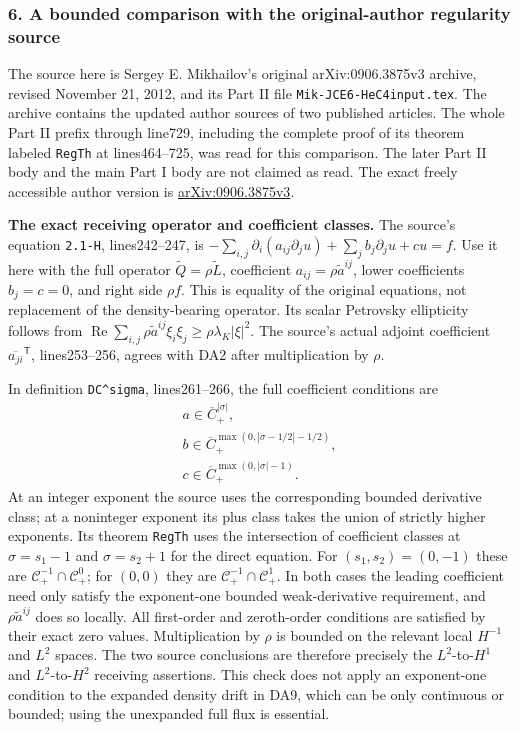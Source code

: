 \documentclass[
  11pt,
]{article}
\begin{document}
\subsubsection{6. A bounded comparison with the original-author
regularity
source}\label{a-bounded-comparison-with-the-original-author-regularity-source}

The source here is Sergey E. Mikhailov's original arXiv:0906.3875v3
archive, revised November 21, 2012, and its Part II file
\texttt{Mik-JCE6-HeC4input.tex}. The archive contains the updated author
sources of two published articles. The whole Part II prefix through
line729, including the complete proof of its theorem labeled
\texttt{RegTh} at lines464--725, was read for this comparison. The later
Part II body and the main Part I body are not claimed as read. The exact
freely accessible author version is
\href{https://arxiv.org/abs/0906.3875v3}{arXiv:0906.3875v3}.

\textbf{The exact receiving operator and coefficient classes.} The
source's equation \texttt{2.1-H}, lines242--247, is
\(-\sum_{i,j}\partial_i(a_{ij}\partial_j u)+\sum_jb_j\partial_ju+cu=f\).
Use it here with the full operator \(\widetilde Q=\rho\widetilde L\),
coefficient \(a_{ij}=\rho\widetilde a^{ij}\), lower coefficients
\(b_j=c=0\), and right side \(\rho f\). This is equality of the original
equations, not replacement of the density-bearing operator. Its scalar
Petrovsky ellipticity follows from
\(\operatorname{Re}\sum_{i,j}\rho\widetilde a^{ij}\xi_i\xi_j\geq\rho\lambda_K|\xi|^2\).
The source's actual adjoint coefficient
\(\overline{a_{ji}}^{\mathsf T}\), lines253--256, agrees with DA2 after
multiplication by \(\rho\).

In definition \texttt{DC\^{}sigma}, lines261--266, the full coefficient
conditions are \[
 \begin{gathered}
 a\in\overline C_+^{|\sigma|},\\
 b\in\overline C_+^{\max(0,|\sigma-1/2|-1/2)},\\
 c\in\overline C_+^{\max(0,|\sigma|-1)}.
 \end{gathered}\tag{DA18}
\] At an integer exponent the source uses the corresponding bounded
derivative class; at a noninteger exponent its plus class takes the
union of strictly higher exponents. Its theorem \texttt{RegTh} uses the
intersection of coefficient classes at \(\sigma=s_1-1\) and
\(\sigma=s_2+1\) for the direct equation. For \((s_1,s_2)=(0,-1)\) these
are \(\mathcal C_+^{-1}\cap\mathcal C_+^0\); for \((0,0)\) they are
\(\mathcal C_+^{-1}\cap\mathcal C_+^1\). In both cases the leading
coefficient need only satisfy the exponent-one bounded weak-derivative
requirement, and \(\rho\widetilde a^{ij}\) does so locally. All
first-order and zeroth-order conditions are satisfied by their exact
zero values. Multiplication by \(\rho\) is bounded on the relevant local
\(H^{-1}\) and \(L^2\) spaces. The two source conclusions are therefore
precisely the \(L^2\)-to-\(H^1\) and \(L^2\)-to-\(H^2\) receiving
assertions. This check does not apply an exponent-one condition to the
expanded density drift in DA9, which can be only continuous or bounded;
using the unexpanded full flux is essential.
\end{document}
